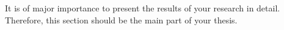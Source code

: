 It is of major importance to present the results of your research in detail. Therefore, this section should be the main part of your thesis.